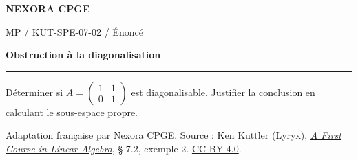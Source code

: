 \documentclass[11pt,a4paper]{article}
\begin{document}
{\small\bfseries\color{nexorablue} NEXORA CPGE}\par
{\small MP / KUT-SPE-07-02 / Énoncé}\par
{\LARGE\bfseries Obstruction à la diagonalisation}\par
\vspace{0.25em}\hrule\vspace{0.6em}

Déterminer si $A=\begin{pmatrix}1&1\\0&1\end{pmatrix}$ est diagonalisable. Justifier la conclusion en calculant le sous-espace propre.

\bigskip
{\footnotesize Adaptation française par Nexora CPGE. Source : Ken Kuttler (Lyryx),
\href{https://math.libretexts.org/Bookshelves/Linear_Algebra/A_First_Course_in_Linear_Algebra_(Kuttler)/07\%253A_Spectral_Theory/7.02\%253A_Diagonalization}{\textit{A First Course in Linear Algebra}}, § 7.2, exemple 2.
\href{https://creativecommons.org/licenses/by/4.0/}{CC BY 4.0}.}
\end{document}

